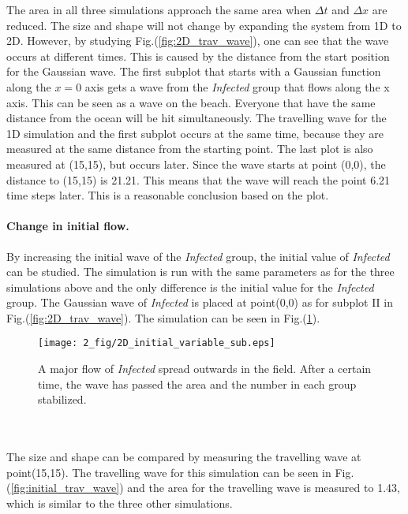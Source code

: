 \documentclass[%
twoside,                 %
final,                   %
chapterprefix=true,      %
open=right               %
10pt]{book}
\begin{document}
\noindent
The area in all three simulations approach the same area when $\Delta t$ and $\Delta x$ are reduced. The size and shape will not change by  expanding the system from 1D to 2D. However, by studying Fig.(\ref{fig:2D_trav_wave}), one can see that the wave occurs at different times. This is caused by the distance from the start position for the Gaussian wave. The first subplot that starts with a Gaussian function along the $x=0$ axis gets a wave from the \emph{Infected} group that flows along the x axis. This can be seen as a wave on the beach. Everyone that have the same distance from the ocean will be hit simultaneously. The travelling wave for the 1D simulation and the first subplot occurs at the same time, because they are measured at the same distance from the starting point. The last plot is also measured at (15,15), but occurs later. Since the wave starts at point (0,0), the distance to (15,15) is 21.21. This means that the wave will reach the point 6.21 time steps later. This is a reasonable conclusion based on the plot.    

\paragraph{Change in initial flow.}
By increasing the initial wave of the \emph{Infected} group, the initial value of \emph{Infected} can be studied. The simulation is run with the same parameters as for the three simulations above and the only difference is the initial value for the \emph{Infected} group. The Gaussian wave of \emph{Infected} is placed at point(0,0) as for subplot II in Fig.(\ref{fig:2D_trav_wave}). The simulation can be seen in Fig.(\ref{fig:initial_value}).  


\begin{figure}[ht]
  \centerline{\texttt{[image: 2\_fig/2D\_initial\_variable\_sub.eps]}}
  \caption{
  \label{fig:initial_value} A major flow of \emph{Infected} spread outwards in the field. After a certain time, the wave has passed the area and the number in each group stabilized.
  }
\end{figure}


\\
\\
The size and shape can be compared by measuring the travelling wave at point(15,15). The travelling wave for this simulation can be seen in Fig.(\ref{fig:initial_trav_wave}) and the area for the travelling wave is measured to 1.43, which is similar to the three other simulations.
\end{document}

